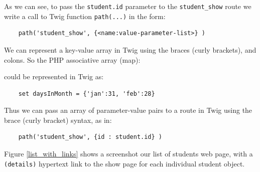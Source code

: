 \documentclass[a4paperpaper,openright]{book}
\newenvironment{Shaded}{}{}
\newcommand{\DecValTok}[1]{\textcolor[rgb]{0.25,0.63,0.44}{#1}}
\newcommand{\KeywordTok}[1]{\textcolor[rgb]{0.00,0.44,0.13}{\textbf{#1}}}
\newcommand{\NormalTok}[1]{#1}
\newcommand{\OtherTok}[1]{\textcolor[rgb]{0.00,0.44,0.13}{#1}}
\newcommand{\StringTok}[1]{\textcolor[rgb]{0.25,0.44,0.63}{#1}}
\begin{document}
As we can see, to pass the \texttt{student.id} parameter to the
\texttt{student\_show} route we write a call to Twig function
\texttt{path(...)} in the form:

\begin{verbatim}
    path('student_show', {<name:value-parameter-list>} )
\end{verbatim}

We can represent a key-value array in Twig using the braces (curly
brackets), and colons. So the PHP associative array (map):

\begin{Shaded}
\end{Shaded}

could be represented in Twig as:

\begin{verbatim}
    set daysInMonth = {'jan':31, 'feb':28}
\end{verbatim}

Thus we can pass an array of parameter-value pairs to a route in Twig
using the brace (curly bracket) syntax, as in:

\begin{verbatim}
    path('student_show', {id : student.id} )
\end{verbatim}

Figure \ref{list_with_links} shows a screenshot our list of students web
page, with a \texttt{(details)} hypertext link to the show page for each
individual student object.
\end{document}
